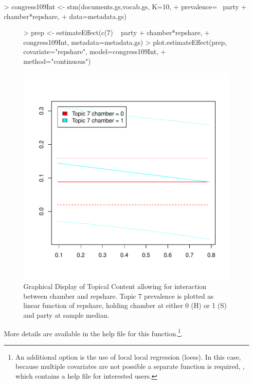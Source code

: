 \documentclass[nojss]{jss}
\begin{document}
\begin{Schunk}
\begin{Sinput}
> congress109Int <- stm(documents.gs,vocab.gs, K=10,
+                       prevalence= ~party + chamber*repshare,
+                       data=metadata.gs)
\end{Sinput}
\end{Schunk}
\begin{figure}[t!]
\begin{center}
\begin{Schunk}
\begin{Sinput}
> prep <- estimateEffect(c(7) ~ party + chamber*repshare,
+         congress109Int, metadata=metadata.gs)
> plot.estimateEffect(prep, covariate="repshare", model=congress109Int,
+                  method="continuous")
\end{Sinput}
\end{Schunk}
\includegraphics{stmVignette-018}
\caption{Graphical Display of Topical Content allowing for interaction between chamber and repshare. Topic 7 prevalence is plotted as linear function of repshare, holding chamber at either 0 (H) or 1 (S) and party at sample median.}
\label{fig:spline2}
\end{center}
\end{figure}

More details are available in the help file for this function.\footnote{An additional option is the use of local local regression (loess). In this case, because multiple covariates are not possible a separate function is required, , which contains a help file for interested users.}.
\end{document}
